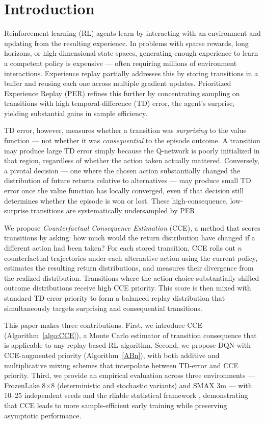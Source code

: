 \documentclass[conference]{IEEEtran}
\begin{document}
\section{Introduction}
\noindent Reinforcement learning (RL) agents learn by interacting with an environment and updating from the resulting experience. In problems with sparse rewards, long horizons, or high-dimensional state spaces, generating enough experience to learn a competent policy is expensive — often requiring millions of environment interactions. Experience replay \cite{mnih2013playingatarideepreinforcement} partially addresses this by storing transitions in a buffer and reusing each one across multiple gradient updates. Prioritized Experience Replay (PER) \cite{schaul2016prioritizedexperiencereplay} refines this further by concentrating sampling on transitions with high temporal-difference (TD) error, the agent's surprise, yielding substantial gains in sample efficiency.

TD error, however, measures whether a transition was \emph{surprising} to the value function — not whether it was \emph{consequential} to the episode outcome. A transition may produce large TD error simply because the Q-network is poorly initialized in that region, regardless of whether the action taken actually mattered. Conversely, a pivotal decision — one where the chosen action substantially changed the distribution of future returns relative to alternatives — may produce small TD error once the value function has locally converged, even if that decision still determines whether the episode is won or lost. These high-consequence, low-surprise transitions are systematically undersampled by PER.

We propose \emph{Counterfactual Consequence Estimation} (CCE), a method that scores transitions by asking: how much would the return distribution have changed if a different action had been taken? For each stored transition, CCE rolls out $n$ counterfactual trajectories under each alternative action using the current policy, estimates the resulting return distributions, and measures their divergence from the realized distribution. Transitions where the action choice substantially shifted outcome distributions receive high CCE priority. This score is then mixed with standard TD-error priority to form a balanced replay distribution that simultaneously targets surprising and consequential transitions.

This paper makes three contributions. First, we introduce CCE (Algorithm~\ref{algo:CCE}), a Monte Carlo estimator of transition consequence that is applicable to any replay-based RL algorithm. Second, we propose DQN with CCE-augmented priority (Algorithm~\ref{ABn}), with both additive and multiplicative mixing schemes that interpolate between TD-error and CCE priority. Third, we provide an empirical evaluation across three environments — FrozenLake 8$\times$8 (deterministic and stochastic variants) and SMAX 3m — with 10--25 independent seeds and the rliable statistical framework \cite{agarwal2021deep}, demonstrating that CCE leads to more sample-efficient early training while preserving asymptotic performance.
\end{document}
